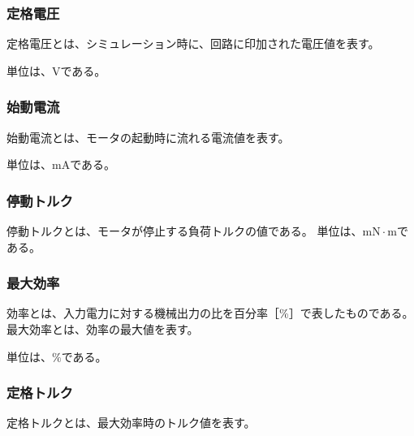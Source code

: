 \subsubsection{定格電圧}\label{sub:sub:dennatu}
定格電圧とは、シミュレーション時に、回路に印加された電圧値を表す。

単位は、$\mathrm{V}$である。
\subsubsection{始動電流}\label{sub:sub:sidouden}
始動電流とは、モータの起動時に流れる電流値を表す。

単位は、$\mathrm{mA}$である。
\subsubsection{停動トルク}\label{sub:sub:teidoutoruku}
停動トルクとは、モータが停止する負荷トルクの値である。
単位は、$\mathrm{mN \cdot m}$である。
\subsubsection{最大効率}\label{sub:sub:saidaikouritu}
効率とは、入力電力に対する機械出力の比を百分率［\%］で表したものである。最大効率とは、効率の最大値を表す。

単位は、$\mathrm{\%}$である。
\subsubsection{定格トルク}\label{sub:sub:teikakutoruku}
定格トルクとは、最大効率時のトルク値を表す。


